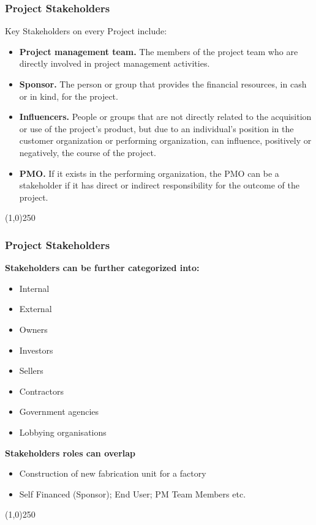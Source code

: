 \begin{frame}
\frametitle{Project Stakeholders}
Key Stakeholders on every Project include:\\
\begin{itemize}
	\item \textbf{Project management team.} The members of the project team who are directly involved in project management activities. 
	\item \textbf{Sponsor.} The person or group that provides the financial resources, in cash or in kind, for the project. 
	\item \textbf{Influencers.} People or groups that are not directly related to the acquisition or use of the project's product, but due to an individual's position in the customer organization or performing organization, can influence, positively or negatively, the course of the project. 
	\item \textbf{PMO.} If it exists in the performing organization, the PMO can be a stakeholder if it has direct or indirect responsibility for the outcome of the project. 
\end{itemize}
\end{frame}
\begin{center}\line(1,0){250}\end{center}





\begin{frame}
\frametitle{Project Stakeholders}
\textbf{Stakeholders can be further categorized into:}\\
	\begin{itemize}
	\item Internal
	\item External
	\item Owners
	\item Investors
	\item Sellers
	\item Contractors
	\item Government agencies
	\item Lobbying organisations
	\end{itemize}
\textbf{Stakeholders roles can overlap}\\
	\begin{itemize}
	\item Construction of new fabrication unit for a factory
	\item Self Financed (Sponsor); End User; PM Team Members etc.
	\end{itemize}
\end{frame}
\begin{center}\line(1,0){250}\end{center}



